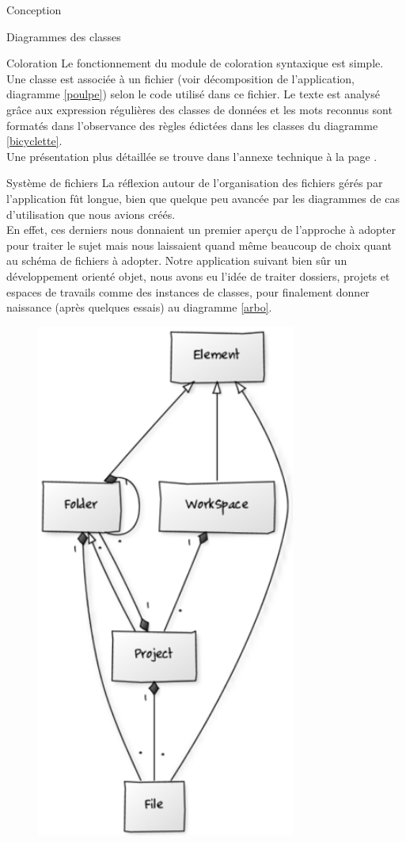 \documentclass[a4paper, 12pt]{report}
\begin{document}
\begin{part}{Conception}
\begin{chapter}{Diagrammes des classes}
\begin{section}{Coloration}
				Le fonctionnement du module de coloration syntaxique est simple. Une classe est associée à un fichier (voir décomposition de
				l'application, diagramme \ref{poulpe}) selon le code utilisé dans ce fichier. Le texte est analysé grâce aux
				\glspl{expression régulière} des classes de données et les mots reconnus sont formatés dans l'observance des règles édictées dans
				les classes du diagramme \ref{bicyclette}.\\
				Une présentation plus détaillée se trouve dans l'annexe technique à la page \pageref{annexe}.
			\end{section}
			\begin{section}{Système de fichiers}
			\label{classSystem}
				La réflexion autour de l'organisation des fichiers gérés par l'application fût longue, bien que quelque peu avancée par les
				diagrammes de cas d'utilisation que nous avions créés.\\
				En effet, ces derniers nous donnaient un premier aperçu de l'approche à adopter pour traiter le sujet mais nous laissaient quand
				même beaucoup de choix quant au schéma de fichiers à adopter. Notre application suivant bien sûr un développement orienté objet, 
				nous avons eu l'idée de traiter dossiers, projets et espaces de travails comme des instances de classes, pour finalement 
				donner naissance (après quelques essais) au diagramme \ref{arbo}. \\
				\begin{figure}[ht]
					\begin{center}
						\includegraphics[height=17cm]{images/diagrammeArborescence.png}

\end{center}
\end{figure}
\end{section}
\end{chapter}
\end{part}
\end{document}
